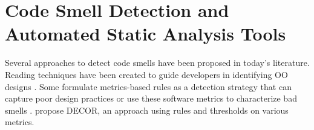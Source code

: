 \section{Code Smell Detection and Automated Static Analysis Tools}

Several approaches to detect code smells have been proposed in today's literature. Reading techniques have been created to guide developers in identifying \ac{OO} designs \citep{Travassos99-ACM-Inspections}. Some formulate metrics-based rules as a detection strategy that can capture poor design practices \citep{Marinescu04-ICSM-DetectionStrategies} or use these software metrics to characterize bad smells \citep{Munro05-BadSmellIdentification}. \citet{moha2010decor} propose \ac{DECOR}, an approach using rules and thresholds on various metrics.













